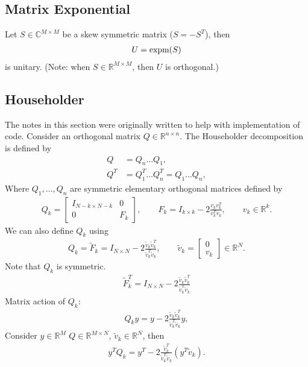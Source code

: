 \documentclass[12pt]{article}
\begin{document}
\subsection{Matrix Exponential}

Let $S\in\mathbb{C}^{M\times M}$ be a skew symmetric matrix ($S=-S^T$), then
\begin{align}
  U = {\rm expm}(S)
\end{align}
%
is unitary. (Note: when $S\in\mathbb{R}^{M\times M}$, then $U$ is orthogonal.)

\subsection{Householder}

The notes in this section were originally written to help with implementation of code.
Consider an orthogonal matrix $Q\in\mathbb{R}^{n\times n}$. The Householder decomposition is defined by
\begin{align}
Q &= Q_n \dots Q_1, \\
Q^T &= Q_1^T \dots Q_n^T = Q_1 \dots Q_n,
\end{align}
%
Where $Q_1, \dots, Q_n$ are symmetric elementary orthogonal matrices defined by
\begin{align}
Q_k = \left[\begin{array}{cc}
I_{N-k \times N-k}&0\\0&F_k
\end{array}\right], \qquad
F_k = I_{k\times k} - 2 \frac{v_k v_k^T}{v_k^T v_k},
\qquad
v_k\in\mathbb{R}^{k}.
\end{align}
%
We can also define $Q_k$ using
\begin{align}
    Q_k = \tilde{F}_k = I_{N\times N} 
    - 2 \frac{\tilde{v}_k \tilde{v}_k^T}{\tilde{v}_k^T \tilde{v}_k},
    \qquad
    \tilde{v}_k = \left[\begin{array}{c}0\\v_k\end{array}\right] \in \mathbb{R}^N.
\end{align}
%
Note that $Q_k$ is symmetric.
\begin{align}
    \tilde{F}_k^T = I_{N\times N} 
    - 2 \frac{\tilde{v}_k \tilde{v}_k^T}{\tilde{v}_k^T \tilde{v}_k}
\end{align}
%
Matrix action of $Q_k$:
\begin{align}
    Q_k y =  y
    - 2 \frac{\tilde{v}_k \tilde{v}_k^T}{\tilde{v}_k^T \tilde{v}_k} y,
\end{align}
%
Consider $y\in\mathbb{R}^M$ $Q\in\mathbb{R}^{M\times N}$,
$\tilde{v}_k\in\mathbb{R}^N$, then
\begin{align}
    y^T Q_k =  y^T
    - 2 \frac{ \tilde{v}_k^T}{\tilde{v}_k^T \tilde{v}_k} (y^T \tilde{v}_k).
\end{align}
%
\end{document}
